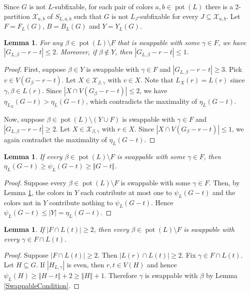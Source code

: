 \documentclass[12pt]{article}
\theoremstyle{plain}
\newtheorem{lem}[thm]{Lemma}
\theoremstyle{definition}
\theoremstyle{remark}
\newcommand{\fancy}[1]{\mathcal{#1}}
\newcommand{\card}[1]{\left|#1\right|}
\newcommand{\size}[1]{\left\Vert#1\right\Vert}
\newcommand{\parens}[1]{\left( #1 \right)}
\newcommand{\pot}{\operatorname{pot}}
\def\X{\fancy{X}}
\begin{document}
	Since $G$ is not $L$-subfixable, for each pair of colors $a,b \in \pot(L)$ there is a 2-partition $\X_{a,b}$ of $S_{L,a,b}$ such that $G$ is not $L_J$-subfixable for every $J \subseteq \X_{a,b}$.  Let $F = F_L(G)$, $B = B_L(G)$ and $Y = Y_L(G)$.
	
	\begin{lem}\label{SwappersAreSparse}
		For any $\beta \in \pot(L) \setminus F$ that is swappable with some $\gamma \in F$, we have $\card{G_{L,\beta} - r - t} \le 2$.  Moreover, if $\beta \not \in Y$, then $\card{G_{L,\beta} - r - t} \le 1$.
	\end{lem}
	\begin{proof}
		First, suppose $\beta \in Y$ is swappable with $\gamma \in F$ and $\card{G_{L,\beta} - r - t} \ge 3$.  Pick $v \in V(G_\beta - r - t)$.  Let $X \in \X_{\beta,\gamma}$ with $v \in X$.  Note that $L_X(r) = L(r)$ since $\gamma, \beta \in L(r)$.  Since $\card{X \cap V(G_\beta - r - t)} \le 2$,  we have $\eta_{L_X}(G - t) > \eta_L(G - t)$, which contradicts the maximality of $\eta_L(G - t)$.
		
		Now, suppose $\beta \in \pot(L) \setminus \parens{Y \cup F}$ is swappable with $\gamma \in F$ and $\card{G_{L,\beta} - r - t} \ge 2$.  Let $X \in \X_{\beta,\gamma}$ with $r \in X$.  Since $\card{X \cap V(G_\beta - r - t)} \le 1$, we again contradict the maximality of $\eta_L(G - t)$.
	\end{proof}
	
	\begin{lem}\label{AllSwappableLowPsi}
		If every $\beta \in \pot(L) \setminus F$ is swappable with some $\gamma \in F$, then $\eta_L(G-t) \ge \psi_L(G - t) \ge \size{G - t}$.
	\end{lem}
	\begin{proof}
		Suppose every $\beta \in \pot(L) \setminus F$ is swappable with some $\gamma \in F$.  Then, by Lemma \ref{SwappersAreSparse}, the colors in $Y$ each contribute at most one to $\psi_L(G - t)$ and the colors not in $Y$ contribute nothing to $\psi_L(G - t)$.  Hence $\psi_L(G - t) \le \card{Y} = \eta_L(G-t)$.
	\end{proof}

	\begin{lem}\label{FIntersectingLt}
		If $\card{F \cap L(t)} \ge 2$, then every $\beta \in \pot(L) \setminus F$ is swappable with every $\gamma \in F \cap L(t)$.
	\end{lem}
	\begin{proof}
		Suppose $\card{F \cap L(t)} \ge 2$.  Then $\card{L(r) \cap L(t)} \ge 2$.  Fix $\gamma \in F \cap L(t)$. Let $H \subseteq G$.  If $\card{H_{L, \gamma}}$ is even, then $r, t \in V(H)$ and hence $\psi_L(H) \ge \size{H-t} + 2 \ge \size{H} + 1$.  Therefore $\gamma$ is swappable with $\beta$ by Lemma \ref{SwappableCondition}.
	\end{proof}
	
\end{document}
